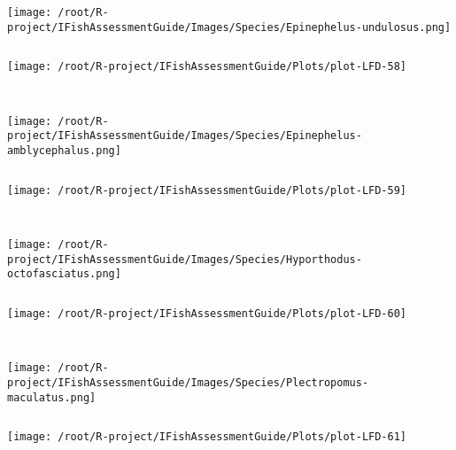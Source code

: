 \documentclass{report}\usepackage[]{graphicx}\usepackage[]{color}
\makeatletter
\def\maxwidth{ %
  \ifdim\Gin@nat@width>\linewidth
    \linewidth
  \else
    \Gin@nat@width
  \fi
}
\newenvironment{kframe}{%
 \def\at@end@of@kframe{}%
 \ifinner\ifhmode%
  \def\at@end@of@kframe{\end{minipage}}%
  \begin{minipage}{\columnwidth}%
 \fi\fi%
 \def\FrameCommand##1{\hskip\@totalleftmargin \hskip-\fboxsep
 \colorbox{shadecolor}{##1}\hskip-\fboxsep
     \hskip-\linewidth \hskip-\@totalleftmargin \hskip\columnwidth}%
 \MakeFramed {\advance\hsize-\width
   \@totalleftmargin\z@ \linewidth\hsize
   \@setminipage}}%
 {\par\unskip\endMakeFramed%
 \at@end@of@kframe}
\newenvironment{knitrout}{}{} %
\makeatother
\begin{document}
\begin{knitrout}
\begin{kframe}
\begin{verbatim}
\end{verbatim}
\end{kframe}
\texttt{[image: /root/R-project/IFishAssessmentGuide/Images/Species/Epinephelus-undulosus.png]}
\begin{kframe}\begin{verbatim}
\end{verbatim}
\end{kframe}
\texttt{[image: /root/R-project/IFishAssessmentGuide/Plots/plot-LFD-58]} 
\begin{kframe}\begin{verbatim}
 
\end{verbatim}
\end{kframe}
\texttt{[image: /root/R-project/IFishAssessmentGuide/Images/Species/Epinephelus-amblycephalus.png]}
\begin{kframe}\begin{verbatim}
\end{verbatim}
\end{kframe}
\texttt{[image: /root/R-project/IFishAssessmentGuide/Plots/plot-LFD-59]} 
\begin{kframe}\begin{verbatim}
 
\end{verbatim}
\end{kframe}
\texttt{[image: /root/R-project/IFishAssessmentGuide/Images/Species/Hyporthodus-octofasciatus.png]}
\begin{kframe}\begin{verbatim}
\end{verbatim}
\end{kframe}
\texttt{[image: /root/R-project/IFishAssessmentGuide/Plots/plot-LFD-60]} 
\begin{kframe}\begin{verbatim}
 
\end{verbatim}
\end{kframe}
\texttt{[image: /root/R-project/IFishAssessmentGuide/Images/Species/Plectropomus-maculatus.png]}
\begin{kframe}\begin{verbatim}
\end{verbatim}
\end{kframe}
\texttt{[image: /root/R-project/IFishAssessmentGuide/Plots/plot-LFD-61]} 
\begin{kframe}\begin{verbatim}
 

\end{verbatim}
\end{kframe}
\end{knitrout}
\end{document}

